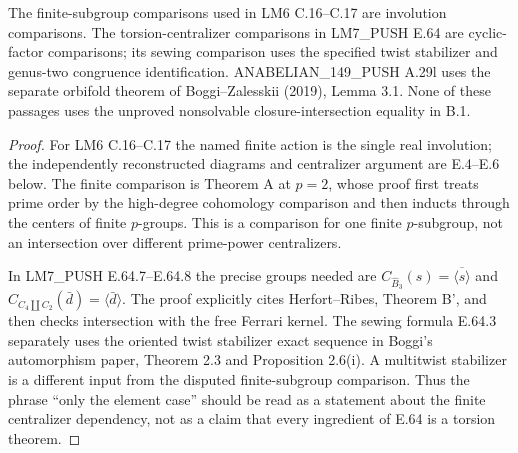 The finite-subgroup comparisons used in LM6 C.16--C.17 are
involution comparisons. The torsion-centralizer comparisons in
LM7\_PUSH E.64 are cyclic-factor comparisons; its sewing comparison
uses the specified twist stabilizer and genus-two congruence
identification. ANABELIAN\_149\_PUSH A.29l uses the separate
orbifold theorem of Boggi--Zalesskii (2019), Lemma 3.1.
None of these passages uses the unproved nonsolvable
closure-intersection equality in B.1.
\begin{proof}
For LM6 C.16--C.17 the named finite action is the single
real involution; the independently reconstructed diagrams and
centralizer argument are E.4--E.6 below. The finite comparison
is Theorem A at $p=2$, whose proof first treats prime order
by the high-degree cohomology comparison and then inducts
through the centers of finite $p$-groups. This is a comparison
for one finite $p$-subgroup, not an intersection over different
prime-power centralizers.

In LM7\_PUSH E.64.7--E.64.8 the precise groups needed are
$C_{\widehat B_3}(s)=\overline{\langle s\rangle}$ and
$C_{C_4\amalg C_2}(\bar d)=\langle\bar d\rangle$.
The proof explicitly cites Herfort--Ribes, Theorem B', and
then checks intersection with the free Ferrari kernel.
The sewing formula E.64.3 separately uses the oriented twist
stabilizer exact sequence in Boggi's automorphism paper,
Theorem 2.3 and Proposition 2.6(i). A multitwist stabilizer
is a different input from the disputed finite-subgroup
comparison. Thus the phrase ``only the element case'' should
be read as a statement about the finite centralizer dependency,
not as a claim that every ingredient of E.64 is a torsion theorem.


\end{proof}
